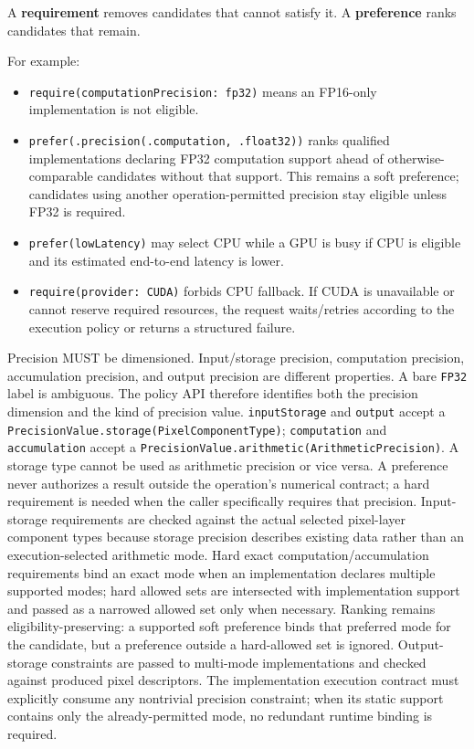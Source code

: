 \documentclass[11pt,a4paper,oneside]{article}
\begin{document}
A \textbf{requirement} removes candidates that cannot satisfy it. A \textbf{preference} ranks candidates that remain.

For example:
\begin{itemize}
  \item \texttt{require(computationPrecision: fp32)} means an FP16-only implementation is not eligible.
  \item \texttt{prefer(.precision(.computation, .float32))} ranks qualified implementations declaring FP32 computation support ahead of otherwise-comparable candidates without that support. This remains a soft preference; candidates using another operation-permitted precision stay eligible unless FP32 is required.
  \item \texttt{prefer(lowLatency)} may select CPU while a GPU is busy if CPU is eligible and its estimated end-to-end latency is lower.
  \item \texttt{require(provider: CUDA)} forbids CPU fallback. If CUDA is unavailable or cannot reserve required resources, the request waits/retries according to the execution policy or returns a structured failure.
\end{itemize}

Precision MUST be dimensioned. Input/storage precision, computation precision, accumulation precision, and output precision are different properties. A bare \texttt{FP32} label is ambiguous. The policy API therefore identifies both the precision dimension and the kind of precision value. \texttt{inputStorage} and \texttt{output} accept a \texttt{PrecisionValue.storage(PixelComponentType)}; \texttt{computation} and \texttt{accumulation} accept a \texttt{PrecisionValue.arithmetic(ArithmeticPrecision)}. A storage type cannot be used as arithmetic precision or vice versa. A preference never authorizes a result outside the operation's numerical contract; a hard requirement is needed when the caller specifically requires that precision. Input-storage requirements are checked against the actual selected pixel-layer component types because storage precision describes existing data rather than an execution-selected arithmetic mode. Hard exact computation/accumulation requirements bind an exact mode when an implementation declares multiple supported modes; hard allowed sets are intersected with implementation support and passed as a narrowed allowed set only when necessary. Ranking remains eligibility-preserving: a supported soft preference binds that preferred mode for the candidate, but a preference outside a hard-allowed set is ignored. Output-storage constraints are passed to multi-mode implementations and checked against produced pixel descriptors. The implementation execution contract must explicitly consume any nontrivial precision constraint; when its static support contains only the already-permitted mode, no redundant runtime binding is required.
\end{document}
